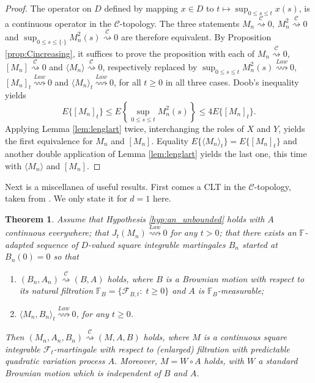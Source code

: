 \documentclass[final]{amsart}
\newtheorem{thm}{Theorem}[section]
\theoremstyle{definition}
\numberwithin{equation}{section}
\def\crochet#1{\langle #1 \rangle}
\newcommand{\dF}{\ensuremath{\mathbb{F}}}
\newcommand{\cF}{\ensuremath{\mathcal{F}}}
\begin{document}
\begin{proof} The operator on $D$ defined by mapping $x\in D$ to $t\mapsto\sup_{0\le s\le t}x(s)$,
is a continuous operator in the $\mathcal{C}$-topology. The three statements
$M_n \stackrel{\mathcal{C}}{\rightsquigarrow} 0$, $M_n^2 \stackrel{\mathcal{C}}{\rightsquigarrow} 0$ and
$\sup_{0\le s\le\{\cdot\}}M_n^2(s) \stackrel{\mathcal{C}}{\rightsquigarrow} 0$ are therefore equivalent.
By Proposition \ref{prop:Cincreasing}, it suffices to prove the proposition with each of
$M_n \stackrel{\mathcal{C}}{\rightsquigarrow} 0$,
 $[M_n] \stackrel{\mathcal{C}}{\rightsquigarrow} 0$ and
$\crochet{ M_n } \stackrel{\mathcal{C}}{\rightsquigarrow} 0$,
respectively replaced by $\sup_{0\le s\le t}M_n^2(s) \stackrel{Law}{\rightsquigarrow}0$,
$[M_n]_t\stackrel{Law}{\rightsquigarrow}0$ and
$\crochet{ M_n }_t\stackrel{Law}{\rightsquigarrow}0$, for all $t\ge0$ in all three cases.
Doob's inequality yields
$$
E\{[M_n]_t\} \le E\left\{\sup_{0\le s\le t}M_n^2(s)\right\}\le 4E\{[M_n]_t\}.
$$
Applying Lemma \ref{lem:lenglart} twice, interchanging the roles of $X$ and $Y$, yields the first equivalence for $M_n$ and $[M_n]$.
Equality $E\{\crochet{ M_n }_t\} = E\{[M_n]_t\}$ and another double application of Lemma \ref{lem:lenglart} yields the last one,
this time with $\crochet{ M_n }$ and $[M_n]$.
\end{proof}
Next is a miscellanea of useful results. First comes a CLT in the $\mathcal{C}$-topology,
taken from \citet{Remillard/Vaillancourt:2023}. We only state it for $d=1$ here.

\begin{thm}\label{thm:jumps_vanish}
Assume that Hypothesis \ref{hyp:an_unbounded} holds with $A$ continuous everywhere; that
$J_t(M_n) \stackrel{Law}{\rightsquigarrow} 0$ for any $t>0$; that there exists an
$\dF$-adapted sequence of $D$-valued square integrable martingales $B_n$ started at $B_n(0)=0$ so that
\begin{enumerate}
\item $(B_n, A_n) \stackrel{\mathcal{C}}{\rightsquigarrow} (B,A)$ holds, where $B$ is a Brownian motion
with respect to its natural filtration $\dF_B = \{\cF_{B,t}: \; t\ge 0\}$ and $A$ is $\dF_B$-measurable;
\item  $\langle M_n, B_n\rangle_t \stackrel{Law}{\rightsquigarrow} 0$, for any $t\ge 0$.
\end{enumerate}
Then $(M_n, A_n,B_n) \stackrel{\mathcal{C}}{\rightsquigarrow} (M,A,B)$ holds,
where $M$ is a continuous square integrable ${\cF}_{t}$-martingale with respect to (enlarged) filtration
with predictable quadratic variation process $A$.
Moreover, $M = W\circ A$ holds, with $W$ a standard Brownian motion which is independent of $B$ and $A$.

\end{thm}
\end{document}
